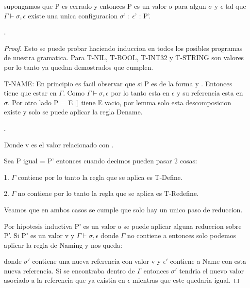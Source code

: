 \begin{theorem}[Progreso]
    supongamos que P es cerrado y 
    entonces P es un valor o para algun $\sigma$ y $\epsilon$ tal que
    $\Gamma \vdash \sigma, \epsilon$ existe una unica configuracion $\sigma$' : $\epsilon$' : P'.  

     \fullarrow {}.

\end{theorem}
\begin{proof}
Esto se puede probar haciendo induccion en todos los posibles programas de nuestra
gramatica. Para T-NIL, T-BOOL, T-INT32 y T-STRING son valores por lo tanto ya quedan demostrados que cumplen.

T-NAME: En principio es facil observar que si P es de la forma 
y . Entonces  tiene que estar en $\Gamma$. Como $\Gamma 
\vdash \sigma, \epsilon$ por lo tanto  esta en $\epsilon$ y su referencia esta en $\sigma$.
 Por otro lado P = E [] tiene E vacio, por lemma solo esta descomposicion existe y solo se puede aplicar la regla Dename.

 \sigmaprogarrow {}.

Donde v es el valor relacionado con . 

Sea P igual  = P' entonces cuando decimos 
 pueden pasar 2 cosas:

    1. $\Gamma$ contiene  por lo tanto la regla que se aplica es
    T-Define.

    2. $\Gamma$ no contiene  por lo tanto la regla que se aplica
    es T-Redefine.

Veamos que en ambos casos se cumple que solo hay un unico paso de reduccion.

Por hipotesis inductiva P' es un valor o se puede aplicar alguna 
reduccion sobre P'. Si P' es un valor v y $\Gamma \vdash \sigma, \epsilon$
 donde $\Gamma$ no contiene a  entonces solo podemos aplicar 
 la regla de Naming y nos queda:

 \fullarrow {}

donde $\sigma'$ contiene una nueva referencia con valor v y $\epsilon'$
 contiene a Name con esta nueva referencia.
Si  se encontraba dentro de $\Gamma$ entonces $\sigma'$
 tendria el nuevo valor asociado a la referencia
que ya existia en $\epsilon$ mientras que este quedaria igual.


\end{proof}

